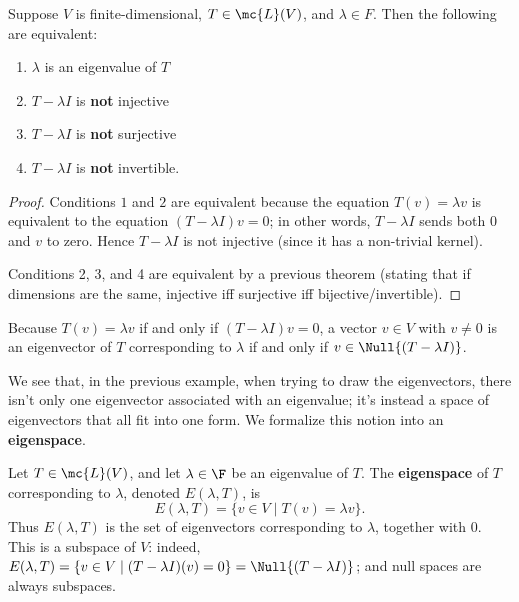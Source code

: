 \documentclass[math0540-lecture-notes.tex]{subfiles}
\begin{document}
\begin{proposition}{}
  Suppose $V$ is finite-dimensional, $T\in \mc{L}(V)$, and $\lambda\in F$. Then the following are
  equivalent:
  \begin{enumerate}
    \item $\lambda$ is an eigenvalue of $T$
    \item $T-\lambda I$ is \textbf{not} injective
    \item $T-\lambda I$ is \textbf{not} surjective
    \item $T-\lambda I$ is \textbf{not} invertible.
  \end{enumerate}
\end{proposition}
\begin{proof}[Proof]
  Conditions $1$ and $2$ are equivalent because the equation $T(v)=\lambda v$ is equivalent to the
  equation $(T-\lambda I)v=0$; in other words, $T-\lambda I$ sends both $0$ and $v$ to zero. Hence
  $T-\lambda I$ is not injective (since it has a non-trivial kernel).

  Conditions 2, 3, and 4 are equivalent by a previous theorem (stating that if dimensions are the
  same, injective iff surjective iff bijective/invertible).
\end{proof}

Because $T(v)=\lambda v$ if and only if $(T-\lambda I)v=0$, a vector $v\in V$ with $v\neq 0$ is an
eigenvector of $T$ corresponding to $\lambda$ if and only if $v\in \Null{(T-\lambda I)}$.

We see that, in the previous example, when trying to draw the eigenvectors, there isn't only one
eigenvector associated with an eigenvalue; it's instead a space of eigenvectors that all fit into
one form. We formalize this notion into an \textbf{eigenspace}.

\begin{definition}[Eigenspace]{}
  Let $T\in \mc{L}(V)$, and let $\lambda\in \F$ be an eigenvalue of $T$. The \textbf{eigenspace} of
  $T$ corresponding to $\lambda$, denoted $E(\lambda,T)$, is \[
    E(\lambda,T)=\{v\in V\mid T(v)=\lambda v\} 
  .\] Thus $E(\lambda,T)$ is the set of eigenvectors corresponding to $\lambda$, together with $0$.
  This is a subspace of $V$: indeed, $E(\lambda,T)=\{v\in V\mid (T-\lambda
  I)(v)=0\}=\Null{(T-\lambda I)}$; and null spaces are always subspaces.
\end{definition}
\end{document}
